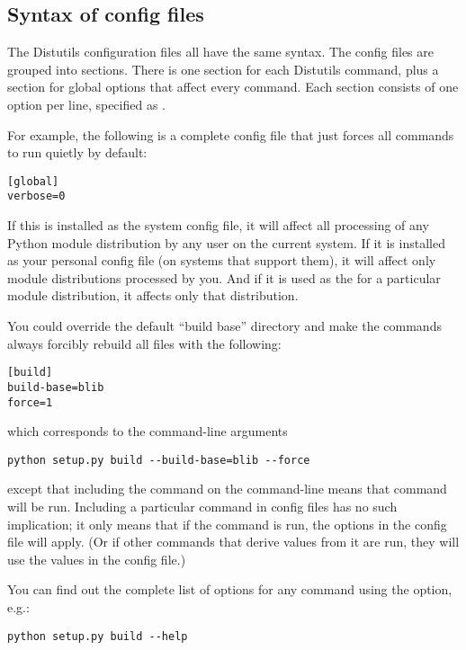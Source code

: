 \documentclass{howto}
\begin{document}
\subsection{Syntax of config files}
\label{config-syntax}

The Distutils configuration files all have the same syntax.  The config
files are grouped into sections.  There is one section for each Distutils
command, plus a  section for global options that affect
every command.  Each section consists of one option per line, specified
as .

For example, the following is a complete config file that just forces
all commands to run quietly by default:

\begin{verbatim}
[global]
verbose=0
\end{verbatim}

If this is installed as the system config file, it will affect all
processing of any Python module distribution by any user on the current
system.  If it is installed as your personal config file (on systems
that support them), it will affect only module distributions processed
by you.  And if it is used as the  for a particular
module distribution, it affects only that distribution.

You could override the default ``build base'' directory and make the
 commands always forcibly rebuild all files with the
following:

\begin{verbatim}
[build]
build-base=blib
force=1
\end{verbatim}

which corresponds to the command-line arguments

\begin{verbatim}
python setup.py build --build-base=blib --force
\end{verbatim}

except that including the  command on the command-line
means that command will be run.  Including a particular command in
config files has no such implication; it only means that if the command
is run, the options in the config file will apply.  (Or if other
commands that derive values from it are run, they will use the values in
the config file.)

You can find out the complete list of options for any command using the
 option, e.g.:

\begin{verbatim}
python setup.py build --help
\end{verbatim}
\end{document}
